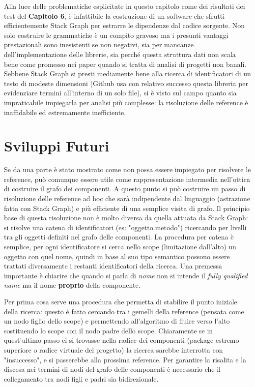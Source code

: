 Alla luce delle problematiche esplicitate in questo capitolo come dei risultati dei test del \textbf{Capitolo 6}, \`e infattibile la costruzione di un software che sfrutti efficientemente Stack Graph per estrarre le dipendenze dal codice sorgente. Non solo costruire le grammatiche \`e un compito gravoso ma i presunti vantaggi prestazionali sono inesistenti se non negativi, sia per mancanze dell'implementazione delle librerie, sia perch\'e questa struttura dati non scala bene come promesso nei paper quando si tratta di analisi di progetti non banali. Sebbene Stack Graph si presti mediamente bene alla ricerca di identificatori di un testo di modeste dimensioni (Github usa con relativo successo questa libreria per evidenziare termini all'interno di un solo file), si \`e visto sul campo quanto sia impraticabile impiegarla per analisi pi\`u complesse: la risoluzione delle reference \`e inaffidabile ed estremamente inefficiente.

\section{Sviluppi Futuri}

Se da una parte \`e stato mostrato come non possa essere impiegato per risolvere le reference, pu\`o comunque essere utile come rappresentazione intermedia nell'ottica di costruire il grafo dei componenti. A questo punto si pu\`o costruire un passo di risoluzione delle reference ad hoc che sar\`a indipendente dal linguaggio (astrazione fatta con Stack Graph) e pi\`u efficiente di una semplice visita di grafo. Il principio base di questa risoluzione non \`e molto diversa da quella attuata da Stack Graph: si risolve una catena di identificatori (es: "oggetto.metodo") ricercando per livelli tra gli oggetti definiti nel grafo delle componenti. La procedura per catena \`e semplice, per ogni identificatore si cerca nello scope (limitazione dall'alto) un oggetto con quel nome, quindi in base al suo tipo semantico possono essere trattati diversamente i restanti identificatori della ricerca. Una premessa importante \`e chiarire che quando si parla di \emph{nome} non si intende il \emph{fully qualified name} ma il nome \textbf{proprio} della componente.

Per prima cosa serve una procedura che permetta di stabilire il punto iniziale della ricerca: questo \`e fatto cercando tra i gemelli della reference (pensata come un nodo figlio dello scope) e permettendo all'algoritmo di fluire verso l'alto sostituendo lo scope con il nodo padre dello scope. Chiaramente se in quest'ultimo passo ci si trovasse nella radice dei componenti (package estremo superiore o radice virtuale del progetto) la ricerca sarebbe interrotta con "insuccesso", e si passerebbe alla prossima reference. Per garantire la risalita e la discesa nei termini di nodi del grafo delle componenti \`e necessario che il collegamento tra nodi figli e padri sia bidirezionale.


